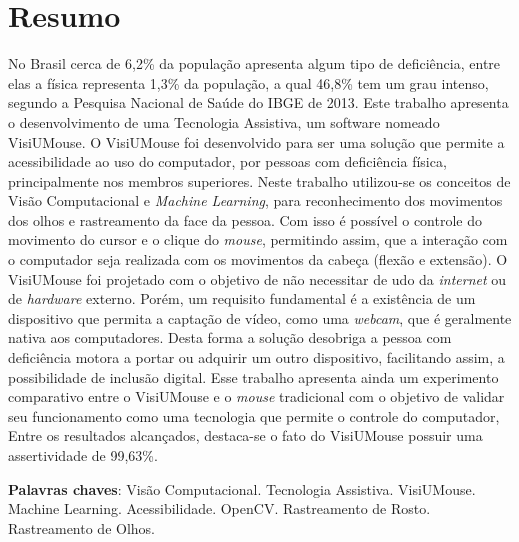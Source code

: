 \chapter*{Resumo}

\begin{singlespace}
{\fontsize{12pt}{\baselineskip} \selectfont \noindent
No Brasil cerca de 6,2\% da população apresenta algum tipo de deficiência, entre elas a física representa 1,3\% da população, a qual 46,8\% tem um grau intenso, segundo a {Pesquisa  Nacional de Saúde do IBGE de 2013}. Este trabalho apresenta o desenvolvimento de uma Tecnologia Assistiva, um software nomeado VisiUMouse. O VisiUMouse foi desenvolvido para ser uma solução que permite a acessibilidade ao uso do computador, por pessoas com deficiência física, principalmente nos membros superiores. Neste trabalho utilizou-se os conceitos de Visão Computacional e \textit{Machine Learning}, para reconhecimento dos movimentos dos olhos e rastreamento da face da pessoa. Com isso é possível o controle do movimento do cursor e o clique do \textit{mouse}, permitindo assim, que a interação com o computador seja realizada com os movimentos da cabeça (flexão e extensão). O VisiUMouse foi projetado com o objetivo de não necessitar de udo da \textit{internet} ou de \textit{hardware} externo. Porém, um requisito fundamental é a existência de um dispositivo que permita a captação de vídeo, como uma \textit{webcam}, que é geralmente nativa aos computadores. Desta forma a solução desobriga a pessoa com deficiência motora a portar ou adquirir um outro dispositivo, facilitando assim, a possibilidade de inclusão digital. Esse trabalho apresenta ainda um experimento comparativo entre o VisiUMouse e o \textit{mouse} tradicional com o objetivo de validar seu funcionamento como uma tecnologia que permite o controle do computador,%
 Entre os resultados alcançados, destaca-se o fato do VisiUMouse possuir uma assertividade de 99,63\%.

}
\end{singlespace}

\begin{singlespace}
\noindent \onehalfspacing
\textbf{Palavras chaves}: Visão Computacional. Tecnologia Assistiva. VisiUMouse. Machine Learning. Acessibilidade. OpenCV. Rastreamento de Rosto. Rastreamento de Olhos.
\end{singlespace}


